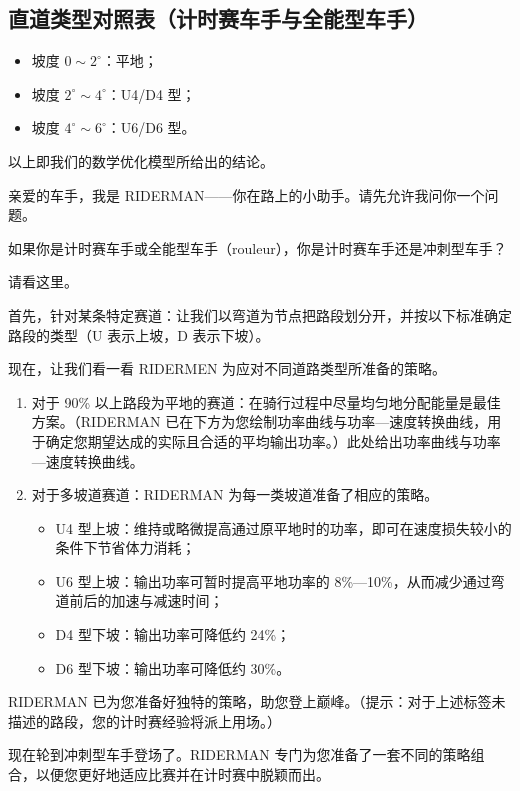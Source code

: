 \documentclass[11pt,a4paper]{ctexart}
\begin{document}
\subsection*{直道类型对照表（计时赛车手与全能型车手）}

\begin{itemize}
\item 坡度 $0\sim 2^{\circ}$：平地；
\item 坡度 $2^{\circ}\sim 4^{\circ}$：U4/D4 型；
\item 坡度 $4^{\circ}\sim 6^{\circ}$：U6/D6 型。
\end{itemize}

以上即我们的数学优化模型所给出的结论。

亲爱的车手，我是 RIDERMAN——你在路上的小助手。请先允许我问你一个问题。

如果你是计时赛车手或全能型车手（rouleur），你是计时赛车手还是冲刺型车手？

请看这里。

首先，针对某条特定赛道：让我们以弯道为节点把路段划分开，并按以下标准确定路段的类型（U 表示上坡，D 表示下坡）。

现在，让我们看一看 RIDERMEN 为应对不同道路类型所准备的策略。

\begin{enumerate}
\item 对于 90\% 以上路段为平地的赛道：在骑行过程中尽量均匀地分配能量是最佳方案。（RIDERMAN 已在下方为您绘制功率曲线与功率—速度转换曲线，用于确定您期望达成的实际且合适的平均输出功率。）此处给出功率曲线与功率—速度转换曲线。
\item 对于多坡道赛道：RIDERMAN 为每一类坡道准备了相应的策略。
  \begin{itemize}
  \item U4 型上坡：维持或略微提高通过原平地时的功率，即可在速度损失较小的条件下节省体力消耗；
  \item U6 型上坡：输出功率可暂时提高平地功率的 8\%—10\%，从而减少通过弯道前后的加速与减速时间；
  \item D4 型下坡：输出功率可降低约 24\%；
  \item D6 型下坡：输出功率可降低约 30\%。
  \end{itemize}
\end{enumerate}

RIDERMAN 已为您准备好独特的策略，助您登上巅峰。（提示：对于上述标签未描述的路段，您的计时赛经验将派上用场。）

现在轮到冲刺型车手登场了。RIDERMAN 专门为您准备了一套不同的策略组合，以便您更好地适应比赛并在计时赛中脱颖而出。
\end{document}
